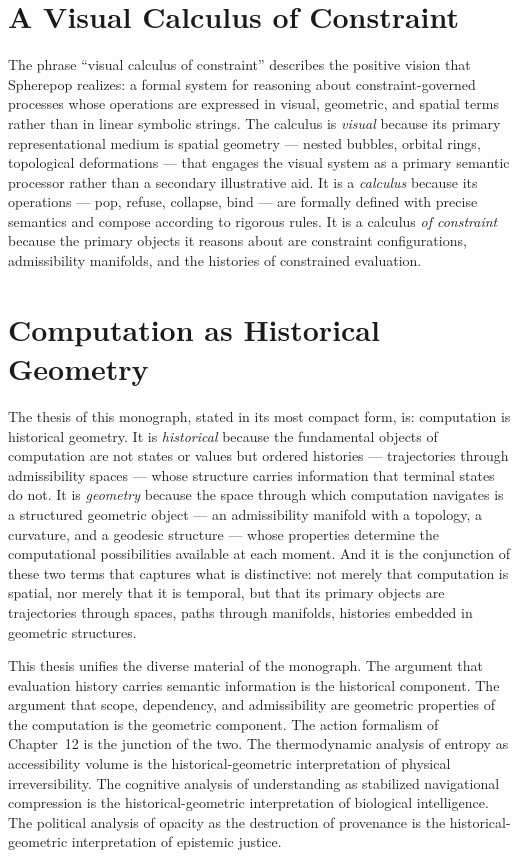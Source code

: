 \documentclass[12pt,openany]{book}
\theoremstyle{plain}
\theoremstyle{definition}
\theoremstyle{remark}
\begin{document}
\section*{A Visual Calculus of Constraint}

The phrase \enquote{visual calculus of constraint} describes the positive vision that Spherepop realizes: a formal system for reasoning about constraint-governed processes whose operations are expressed in visual, geometric, and spatial terms rather than in linear symbolic strings. The calculus is \emph{visual} because its primary representational medium is spatial geometry — nested bubbles, orbital rings, topological deformations — that engages the visual system as a primary semantic processor rather than a secondary illustrative aid. It is a \emph{calculus} because its operations — pop, refuse, collapse, bind — are formally defined with precise semantics and compose according to rigorous rules. It is a calculus \emph{of constraint} because the primary objects it reasons about are constraint configurations, admissibility manifolds, and the histories of constrained evaluation.

\section*{Computation as Historical Geometry}

The thesis of this monograph, stated in its most compact form, is: computation is historical geometry. It is \emph{historical} because the fundamental objects of computation are not states or values but ordered histories — trajectories through admissibility spaces — whose structure carries information that terminal states do not. It is \emph{geometry} because the space through which computation navigates is a structured geometric object — an admissibility manifold with a topology, a curvature, and a geodesic structure — whose properties determine the computational possibilities available at each moment. And it is the conjunction of these two terms that captures what is distinctive: not merely that computation is spatial, nor merely that it is temporal, but that its primary objects are trajectories through spaces, paths through manifolds, histories embedded in geometric structures.

This thesis unifies the diverse material of the monograph. The argument that evaluation history carries semantic information is the historical component. The argument that scope, dependency, and admissibility are geometric properties of the computation is the geometric component. The action formalism of Chapter~12 is the junction of the two. The thermodynamic analysis of entropy as accessibility volume is the historical-geometric interpretation of physical irreversibility. The cognitive analysis of understanding as stabilized navigational compression is the historical-geometric interpretation of biological intelligence. The political analysis of opacity as the destruction of provenance is the historical-geometric interpretation of epistemic justice.
\end{document}
